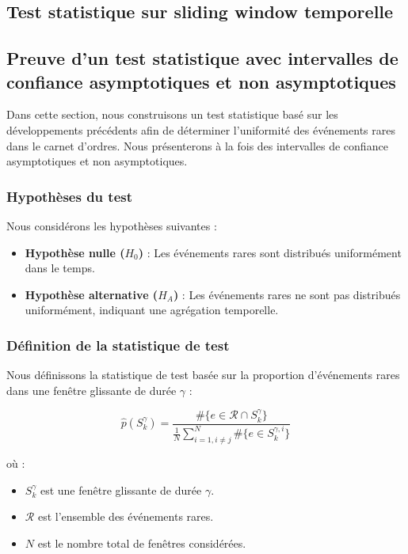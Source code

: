 \documentclass[12pt,a4paper]{article}
\theoremstyle{definition}
\theoremstyle{remark}
\begin{document}
\subsection{Test statistique sur sliding window temporelle}


\subsection{Preuve d'un test statistique avec intervalles de confiance asymptotiques et non asymptotiques}

Dans cette section, nous construisons un test statistique basé sur les développements précédents afin de déterminer l'uniformité des événements rares dans le carnet d'ordres. Nous présenterons à la fois des intervalles de confiance asymptotiques et non asymptotiques.

\subsubsection{Hypothèses du test}

Nous considérons les hypothèses suivantes :

\begin{itemize}
    \item \textbf{Hypothèse nulle ($H_0$)} : Les événements rares sont distribués uniformément dans le temps.
    \item \textbf{Hypothèse alternative ($H_A$)} : Les événements rares ne sont pas distribués uniformément, indiquant une agrégation temporelle.
\end{itemize}

\subsubsection{Définition de la statistique de test}

Nous définissons la statistique de test basée sur la proportion d'événements rares dans une fenêtre glissante de durée $\gamma$ :

$$
\hat{p}(S_k^{\gamma}) = \frac{\#\{e \in \mathcal{R} \cap S_k^{\gamma}\}}{\frac{1}{N} \sum_{i=1, i \neq j}^N \#\{e \in S_k^{\gamma, i}\}}
$$

où :
\begin{itemize}
    \item $S_k^{\gamma}$ est une fenêtre glissante de durée $\gamma$.
    \item $\mathcal{R}$ est l'ensemble des événements rares.
    \item $N$ est le nombre total de fenêtres considérées.
\end{itemize}
\end{document}
